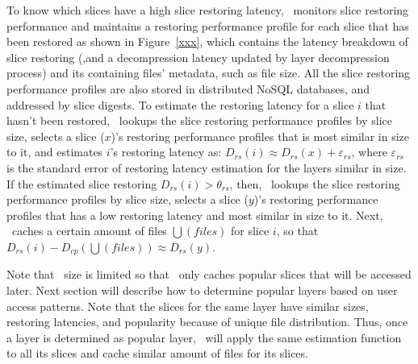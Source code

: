 To know which slices have a high slice restoring latency,
\dedupname~monitors slice restoring performance and 
maintains a restoring performance  profile for each slice that has been restored as shown in Figure~\ref{xxx},
which contains the latency breakdown of slice restoring (,and a decompression latency updated by layer decompression process) and its containing files' metadata, such as file size.
All the slice restoring performance profiles are also stored in distributed NoSQL databases,
 and addressed by slice digests. 
To estimate the restoring latency for a slice $i$ that hasn't been restored, 
\dedupname~lookups the slice restoring performance profiles by slice size,
 selects a slice ($x$)'s restoring performance profiles that is most similar in size to it,
 and estimates $i$'s restoring latency as: $D_{rs}(i) \approx D_{rs}(x) + \varepsilon_{rs}$,
 where $\varepsilon_{rs}$ is the standard error of restoring latency estimation for the layers similar in size.
If the estimated slice restoring $D_{rs}(i) > \theta_{rs}$,
then, \dedupname~lookups the slice restoring performance profiles by slice size,
selects a slice ($y$)'s restoring performance profiles that has a low restoring latency and
most similar in size to it.
Next, \dedupname~caches a certain amount of files $\bigcup(files)$ for slice $i$, so that
$D_{rs}(i) - D_{cp}(\bigcup(files)) \approx D_{rs}(y)$.

Note that \filecachename~size is limited so that \filecachename~only caches popular slices
that will be accessed later. 
Next section will describe how to determine popular layers based on user access patterns.
Note that the slices for the same layer have similar sizes, restoring latencies, and popularity because of unique file
distribution. Thus, once a layer is determined as popular layer, \dedupname~will apply the same estimation function to all its slices and cache similar amount of files for its slices.






 





